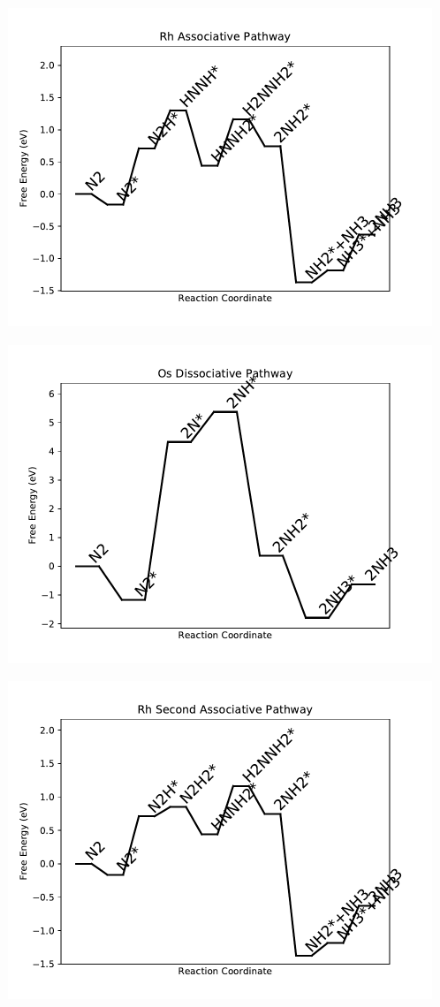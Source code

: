 \begin{figure}
\includegraphics[width=0.8\linewidth]{data/plots/Rh_associative.pdf}
\end{figure}

\begin{figure}
\includegraphics[width=0.8\linewidth]{data/plots/Os_dissociative.pdf}
\end{figure}

\begin{figure}
\includegraphics[width=0.8\linewidth]{data/plots/Rh_associative_2.pdf}
\end{figure}

